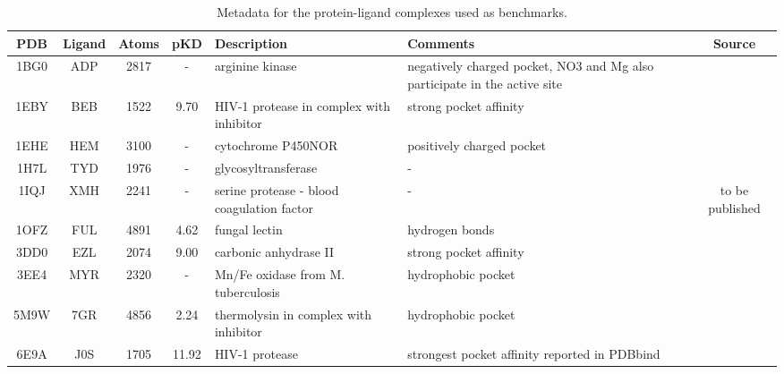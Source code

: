   \begin{table}[H]
    \caption{\label{tab:appx1/benchmark_prot} Metadata for the protein-ligand complexes used as benchmarks.}
    \centering
    \begin{tabular}{ccccp{1.5in}p{1.5in}c}
      \hline
      PDB  & Ligand  & Atoms & pKD   & Description                                & Comments                                                                   & Source                            \\ \hline
      1BG0 & ADP     & 2817  & -     & arginine kinase                            & negatively charged pocket, NO3 and Mg also participate in the active site & \cite{benchmark_negative_2000}    \\ \hline
      1EBY & BEB     & 1522  & 9.70  & HIV-1 protease in complex with inhibitor   & strong pocket affinity                                                     & \cite{benchmark_strong_2021}      \\ \hline
      1EHE & HEM     & 3100  & -     & cytochrome P450NOR                         & positively charged pocket                                                  & \cite{benchmark_positive_2001}    \\ \hline
      1H7L & TYD     & 1976  & -     & glycosyltransferase                        & -                                                                          & \cite{benchmark_1h7l_2001}        \\ \hline
      1IQJ & XMH     & 2241  & -     & serine protease - blood coagulation factor & -                                                                          & to be published                   \\ \hline
      1OFZ & FUL     & 4891  & 4.62  & fungal lectin                              & hydrogen bonds                                                             & \cite{hbonds_2023}                \\ \hline
      3DD0 & EZL     & 2074  & 9.00  & carbonic anhydrase II                      & strong pocket affinity                                                     & \cite{benchmark_strong_2021}      \\ \hline
      3EE4 & MYR     & 2320  & -     & Mn/Fe oxidase from M. tuberculosis         & hydrophobic pocket                                                         & \cite{benchmark_hydrophobic_2009} \\ \hline
      5M9W & 7GR     & 4856  & 2.24  & thermolysin in complex with inhibitor      & hydrophobic pocket                                                         & \cite{hydrophobic_2017}           \\ \hline
      6E9A & J0S     & 1705  & 11.92 & HIV-1 protease                             & strongest pocket affinity reported in PDBbind                              & \cite{pdbbind_2004}               \\ \hline
    \end{tabular}
  \end{table}

